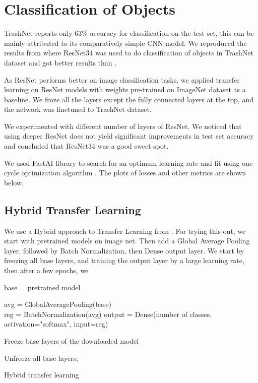 \documentclass{article}
\begin{document}



\section{Classification of Objects}
TrashNet \cite{yang2016classification} reports only 63\% accuracy for classification on the test set, this can be mainly attributed to its comparatively simple CNN model. We reproduced the results from \cite{CollinChing} where ResNet34 was used to do classification of objects in TrashNet dataset  \cite{yang2016classification} and got better results than \cite{CollinChing}. 

As ResNet \cite{he2016deep} performs better on image classification tasks, we applied transfer learning on ResNet models with weights pre-trained on ImageNet dataset as a baseline. We froze all the layers except the fully connected layers at the top, and the network was finetuned to TrashNet dataset. 

We experimented with different number of layers of ResNet. We noticed that using deeper ResNet does not yield significant improvements in test set accuracy and concluded that ResNet34 was a good sweet spot. 

We used FastAI \cite{howard2018fastai} library to search for an optimum learning rate and fit using one cycle optimization algorithm \cite{1CyclePolicy}. The plots of losses and other metrics are shown below. 

\subsection{Hybrid Transfer Learning}
We use a Hybrid approach to Transfer Learning from \cite{geron2019hands}. For trying this out, we start with pretrained models on image net. Then add a Global Average Pooling layer, followed by Batch Normalization, then Dense output layer. We start by freezing all base layers, and training the output layer by a large learning rate, then after a few epochs, we 

\begin{algorithm}[H]
\SetAlgoLined
{}
 base =  pretrained model \;
 
 avg = GlobalAveragePooling(base) \\
 reg = BatchNormalization(avg)
 output = Dense(number of classes, activation="softmax", input=reg)

 Freeze base layers of the downloaded model\;

 
 Unfreeze all base layers; 
 
 \caption{Hybrid transfer learning}
\end{algorithm}
\end{document}
